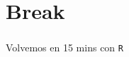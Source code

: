 \documentclass[
  shownotes,
  xcolor={svgnames},
  hyperref={colorlinks,citecolor=DarkBlue,linkcolor=DarkRed,urlcolor=DarkBlue}
  , aspectratio=169]{beamer}
\begin{document}


\section{Break}
\begin{frame}
\frametitle{}

\begin{centering}
\huge
\textcolor{andesred}{Volvemos en 15 mins con \texttt{R} }

\end{centering}

\end{frame}
\end{document}
